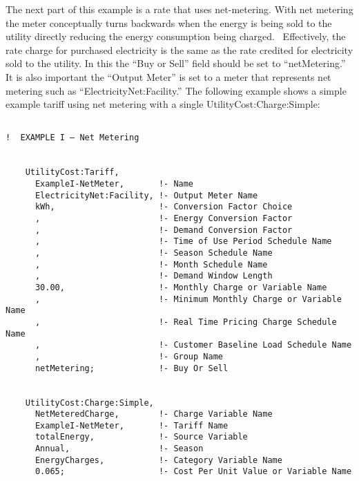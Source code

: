 The next part of this example is a rate that uses net-metering. With net metering the meter conceptually turns backwards when the energy is being sold to the utility directly reducing the energy consumption being charged.~ Effectively, the rate charge for purchased electricity is the same as the rate credited for electricity sold to the utility. In this the ``Buy or Sell'' field should be set to ``netMetering.''~ It is also important the ``Output Meter'' is set to a meter that represents net metering such as ``ElectricityNet:Facility.'' The following example shows a simple example tariff using net metering with a single UtilityCost:Charge:Simple:

\begin{lstlisting}

!  EXAMPLE I – Net Metering


    UtilityCost:Tariff,
      ExampleI-NetMeter,       !- Name
      ElectricityNet:Facility, !- Output Meter Name
      kWh,                     !- Conversion Factor Choice
      ,                        !- Energy Conversion Factor
      ,                        !- Demand Conversion Factor
      ,                        !- Time of Use Period Schedule Name
      ,                        !- Season Schedule Name
      ,                        !- Month Schedule Name
      ,                        !- Demand Window Length
      30.00,                   !- Monthly Charge or Variable Name
      ,                        !- Minimum Monthly Charge or Variable Name
      ,                        !- Real Time Pricing Charge Schedule Name
      ,                        !- Customer Baseline Load Schedule Name
      ,                        !- Group Name
      netMetering;             !- Buy Or Sell


    UtilityCost:Charge:Simple,
      NetMeteredCharge,        !- Charge Variable Name
      ExampleI-NetMeter,       !- Tariff Name
      totalEnergy,             !- Source Variable
      Annual,                  !- Season
      EnergyCharges,           !- Category Variable Name
      0.065;                   !- Cost Per Unit Value or Variable Name
\end{lstlisting}